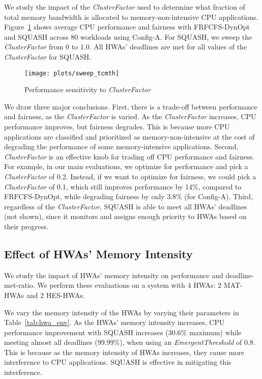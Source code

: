 \documentclass[10pt,letterpaper]{article}
\newif\ifSQUEEZE
\begin{document}
We study the impact of the \emph{ClusterFactor} used to determine what fraction of
total memory bandwidth is allocated to memory-non-intensive CPU applications.
Figure~\ref{plot:sweep_tcmthreshold} shows average CPU performance and
fairness with FRFCFS-DynOpt and SQUASH across 80 workloads using Config-A.
For SQUASH, we sweep the \emph{ClusterFactor} from 0 to 1.0. All HWAs' deadlines are
met for all values of the \emph{ClusterFactor} for SQUASH.

\begin{figure}[ht!]
  \centering
  \texttt{[image: plots/sweep\_tcmth]}
\caption{Performance sensitivity to \emph{ClusterFactor}}
  \label{plot:sweep_tcmthreshold}
\end{figure}


We draw three major conclusions. First, there is a trade-off between performance
and fairness, as the \emph{ClusterFactor} is varied. As
the \emph{ClusterFactor} increases, CPU performance improves, but fairness degrades.
This is because more CPU applications are classified and prioritized
as memory-non-intensive at the cost of degrading the
performance of some memory-intensive applications.
Second, \emph{ClusterFactor} is an effective knob for trading off CPU
performance and fairness. For example, in our main evaluations, we optimize for
performance and pick a \emph{ClusterFactor} of 0.2. Instead, if we want to optimize
for fairness, we could pick a \emph{ClusterFactor} of 0.1, which still improves
performance by 14\%, compared to FRFCFS-DynOpt, while degrading fairness by only
3.8\% (for Config-A). Third, regardless of the \emph{ClusterFactor}, SQUASH is able to
meet all HWAs' deadlines (not shown), since it monitors and assigns enough priority
to HWAs based on their progress. 






\subsection{Effect of HWAs' Memory Intensity}

\ifSQUEEZE
We study the impact of HWAs' memory intensity 
on a system with 2 MAT-HWAs and 2 HES-HWAs. 
\else
We study the impact of HWAs' memory intensity on performance and
deadline-met-ratio. We perform these evaluations on a system with 4 HWAs: 2
MAT-HWAs and 2 HES-HWAs. 
\fi
We vary the memory intensity of the HWAs by varying
their parameters in Table~\ref{tab:hwa_env}. 
As the HWAs' memory intensity increases, CPU performance improvement with SQUASH
increases (30.6\% maximum) while meeting almost all deadlines (99.99\%), when
using an \emph{EmergentThreshold} of 0.8. This is because as the memory intensity
of HWAs increases, they cause more interference to CPU applications. SQUASH is
effective in mitigating this interference.
\end{document}
